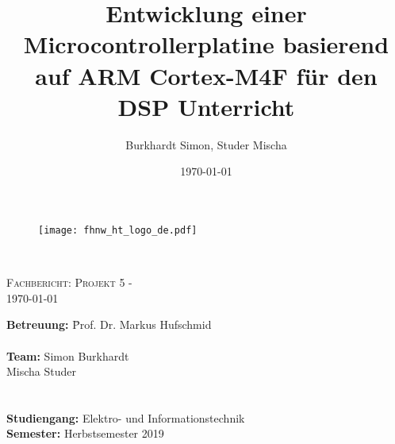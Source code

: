 \documentclass[final]{fhnwreport}       %
\title{\textbf{Entwicklung einer Microcontrollerplatine basierend auf ARM Cortex-M4F für den DSP Unterricht}}  		        %
\author{Burkhardt Simon, Studer Mischa} %
\date{\today}          				   %
\begin{document}
\thispagestyle{empty}
	\begin{figure}
		 \vspace*{-\topskip}\vspace*{-\headsep}
		\texttt{[image: fhnw\_ht\_logo\_de.pdf]}
	\end{figure}
	\begin{center}
		\vspace*{2cm}
		{\huge{\textbf{\thetitle}}}\\
		\vspace*{0.5cm}
		
		{\scshape\Large Fachbericht: Projekt 5 - \theauthor \\} \Large{\today}
		\vfill
		\begin{normalsize}
			{\begin{tabbing}
					\textbf{Betreuung:} \hspace{5cm}\= Prof. Dr. Markus Hufschmid\\
					
					
					\\[0.8cm]
					\textbf{Team:} \> Simon Burkhardt\\ 
					\> Mischa Studer\\
					\\[0.8cm]
					\\[0.8cm]
					\textbf{Studiengang:} \>Elektro- und Informationstechnik
					\\[0.8cm]	\textbf{Semester:} \>Herbstsemester 2019
			\end{tabbing}}
		\end{normalsize}
		\vfill
	\end{center}
\clearpage

\thispagestyle{empty}
\begin{otherlanguage}{english}

\end{otherlanguage}

\tableofcontents
\clearpage
\end{document}
